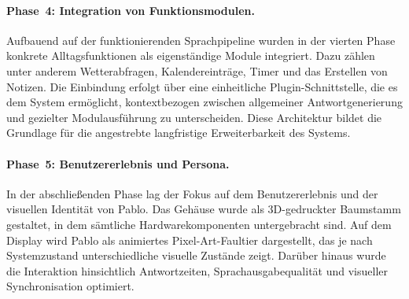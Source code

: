 \paragraph{Phase~4: Integration von Funktionsmodulen.}
Aufbauend auf der funktionierenden Sprachpipeline wurden in der vierten Phase konkrete Alltagsfunktionen als eigenständige Module integriert.
Dazu zählen unter anderem Wetterabfragen, Kalendereinträge, Timer und das Erstellen von Notizen.
Die Einbindung erfolgt über eine einheitliche Plugin-Schnittstelle, die es dem System ermöglicht, kontextbezogen zwischen allgemeiner Antwortgenerierung und gezielter Modulausführung zu unterscheiden.
Diese Architektur bildet die Grundlage für die angestrebte langfristige Erweiterbarkeit des Systems.

\paragraph{Phase~5: Benutzererlebnis und Persona.}
In der abschließenden Phase lag der Fokus auf dem Benutzererlebnis und der visuellen Identität von Pablo.
Das Gehäuse wurde als 3D-gedruckter Baumstamm gestaltet, in dem sämtliche Hardwarekomponenten untergebracht sind.
Auf dem Display wird Pablo als animiertes Pixel-Art-Faultier dargestellt, das je nach Systemzustand unterschiedliche visuelle Zustände zeigt.
Darüber hinaus wurde die Interaktion hinsichtlich Antwortzeiten, Sprachausgabequalität und visueller Synchronisation optimiert.

